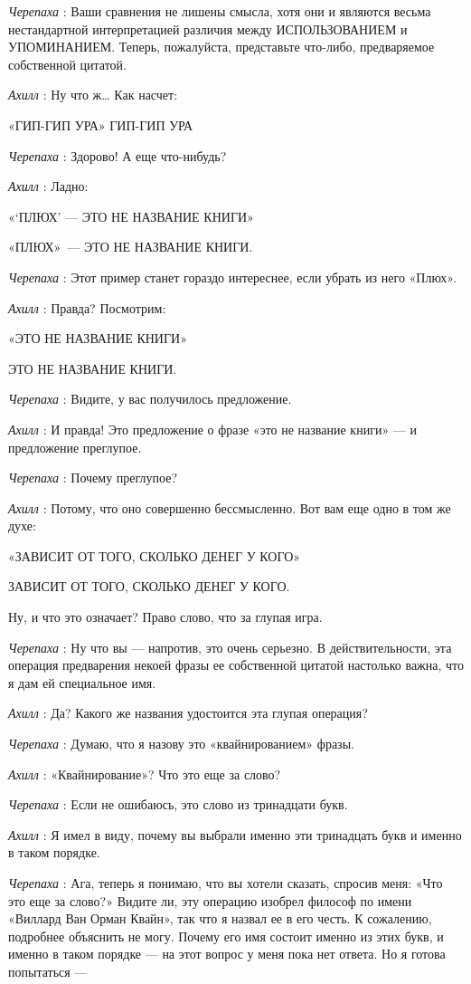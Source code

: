 \documentclass[../main.tex]{subfiles}
\begin{document}
\begin{dialogue}
\emph{Черепаха} : Ваши сравнения не лишены смысла, хотя они и являются весьма нестандартной интерпретацией различия между ИСПОЛЬЗОВАНИЕМ и УПОМИНАНИЕМ. Теперь, пожалуйста, представьте что-либо, предваряемое собственной цитатой.

\emph{Ахилл} : Ну что ж\ldots{} Как насчет:

«ГИП-ГИП УРА» ГИП-ГИП УРА

\emph{Черепаха} : Здорово! А еще что-нибудь?

\emph{Ахилл} : Ладно:

«\enquote*{ПЛЮХ} --- ЭТО НЕ НАЗВАНИЕ КНИГИ»

«ПЛЮХ»~--- ЭТО НЕ НАЗВАНИЕ КНИГИ.

\emph{Черепаха} : Этот пример станет гораздо интереснее, если убрать из него «Плюх».

\emph{Ахилл} : Правда? Посмотрим:

«ЭТО НЕ НАЗВАНИЕ КНИГИ»

ЭТО НЕ НАЗВАНИЕ КНИГИ.

\emph{Черепаха} : Видите, у вас получилось предложение.

\emph{Ахилл} : И правда! Это предложение о фразе «это не название книги» --- и предложение преглупое.

\emph{Черепаха} : Почему преглупое?

\emph{Ахилл} : Потому, что оно совершенно бессмысленно. Вот вам еще одно в том же духе:

«ЗАВИСИТ ОТ ТОГО, СКОЛЬКО ДЕНЕГ У КОГО»

ЗАВИСИТ ОТ ТОГО, СКОЛЬКО ДЕНЕГ У КОГО.

Ну, и что это означает? Право слово, что за глупая игра.

\emph{Черепаха} : Ну что вы --- напротив, это очень серьезно. В действительности, эта операция предварения некоей фразы ее собственной цитатой настолько важна, что я дам ей специальное имя.

\emph{Ахилл} : Да? Какого же названия удостоится эта глупая операция?

\emph{Черепаха} : Думаю, что я назову это «квайнированием» фразы.

\emph{Ахилл} : «Квайнирование»? Что это еще за слово?

\emph{Черепаха} : Если не ошибаюсь, это слово из тринадцати букв.

\emph{Ахилл} : Я имел в виду, почему вы выбрали именно эти тринадцать букв и именно в таком порядке.

\emph{Черепаха} : Ага, теперь я понимаю, что вы хотели сказать, спросив меня: «Что это еще за слово?» Видите ли, эту операцию изобрел философ по имени «Виллард Ван Орман Квайн», так что я назвал ее в его честь. К сожалению, подробнее объяснить не могу. Почему его имя состоит именно из этих букв, и именно в таком порядке --- на этот вопрос у меня пока нет ответа. Но я готова попытаться ---


\end{dialogue}
\end{document}
